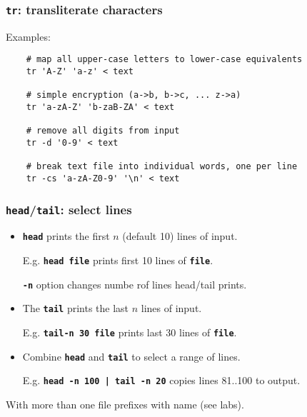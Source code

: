 \begin{frame}[fragile]
\frametitle{\textbf{\tt{tr}}: transliterate characters}
Examples:
\begin{verbatim}
    # map all upper-case letters to lower-case equivalents
    tr 'A-Z' 'a-z' < text
    
    # simple encryption (a->b, b->c, ... z->a)
    tr 'a-zA-Z' 'b-zaB-ZA' < text
    
    # remove all digits from input
    tr -d '0-9' < text
    
    # break text file into individual words, one per line
    tr -cs 'a-zA-Z0-9' '\n' < text
\end{verbatim}

\end{frame}

\begin{frame}
\frametitle{\textbf{\tt{head}}/\textbf{\tt{tail}}: select lines}

\begin{itemize}
\item
\textbf{\tt{head}} prints the first $n$ (default 10) lines of input.

E.g. \textbf{\tt{head file}} prints first 10 lines of \textbf{\tt{file}}.

\textbf{\tt{-n}} option changes numbe rof lines head/tail prints.

\item

The \textbf{\tt{tail}} prints the last  $n$   lines of input.

E.g. \textbf{\tt{tail-n 30 file}} prints last 30 lines of \textbf{\tt{file}}.

\item
Combine \textbf{\tt{head}} and \textbf{\tt{tail}} to select a range of lines.

E.g. \textbf{\tt{head -n 100 | tail -n 20}} copies lines 81..100 to output.

\end{itemize}

With more than one file prefixes with name (see labs).
\end{frame}

